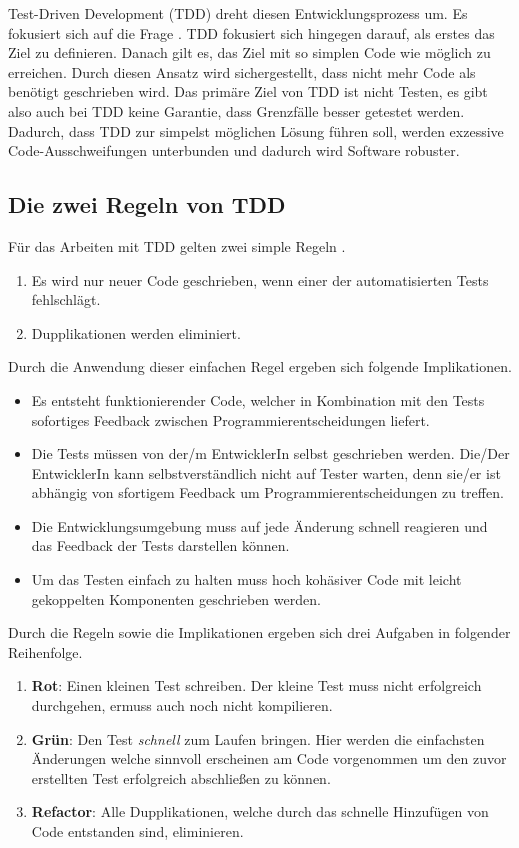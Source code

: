 Test-Driven Development (TDD) dreht diesen Entwicklungsprozess um. Es fokusiert sich auf die Frage . TDD fokusiert sich hingegen darauf, als erstes das Ziel zu definieren. Danach gilt es, das Ziel mit so simplen Code wie möglich zu erreichen. Durch diesen Ansatz wird sichergestellt, dass nicht mehr Code als benötigt geschrieben wird. Das primäre Ziel von TDD ist nicht Testen, es gibt also auch bei TDD keine Garantie, dass Grenzfälle besser getestet werden. Dadurch, dass TDD zur simpelst möglichen Lösung führen soll, werden exzessive Code-Ausschweifungen unterbunden und dadurch wird Software robuster.

\subsection{Die zwei Regeln von TDD}
Für das Arbeiten mit TDD gelten zwei simple Regeln \autocite[]{Beck:2003}.
\begin{enumerate}
  \item Es wird nur neuer Code geschrieben, wenn einer der automatisierten Tests fehlschlägt.
  \item Dupplikationen werden eliminiert.
\end{enumerate}
Durch die Anwendung dieser einfachen Regel ergeben sich folgende Implikationen.
\begin{itemize}
  \item Es entsteht funktionierender Code, welcher in Kombination mit den Tests sofortiges Feedback zwischen Programmierentscheidungen liefert.
  \item Die Tests müssen von der/m EntwicklerIn selbst geschrieben werden. Die/Der EntwicklerIn kann selbstverständlich nicht auf Tester warten, denn sie/er ist abhängig von sfortigem Feedback um Programmierentscheidungen zu treffen.
  \item Die Entwicklungsumgebung muss auf jede Änderung schnell reagieren und das Feedback der Tests darstellen können.
  \item Um das Testen einfach zu halten muss hoch kohäsiver Code mit leicht gekoppelten Komponenten geschrieben werden.
\end{itemize}
Durch die Regeln sowie die Implikationen ergeben sich drei Aufgaben in folgender Reihenfolge.
\begin{enumerate}
  \item \textbf{Rot}: Einen kleinen Test schreiben.\newline
  Der kleine Test muss nicht erfolgreich durchgehen, ermuss auch noch nicht kompilieren.
  \item \textbf{Grün}: Den Test \textit{schnell} zum Laufen bringen.\newline
  Hier werden die einfachsten Änderungen welche sinnvoll erscheinen am Code vorgenommen um den zuvor erstellten Test erfolgreich abschließen zu können.
  \item \textbf{Refactor}: Alle Dupplikationen, welche durch das schnelle Hinzufügen von Code entstanden sind, eliminieren.
\end{enumerate}
